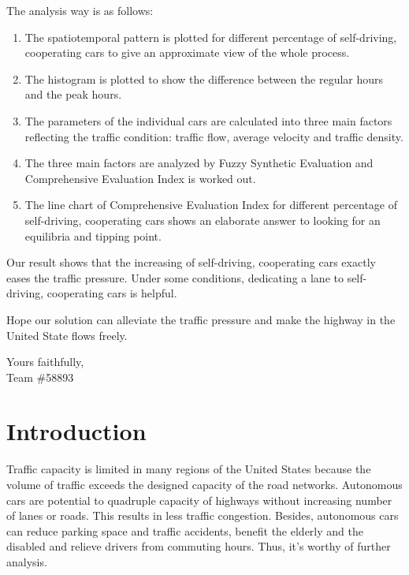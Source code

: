 \documentclass[a4paper]{article}
\begin{document}
\begin{spacing}{1.4}
		The analysis way is as follows:
		\begin{enumerate}
			\item The spatiotemporal pattern is plotted for different percentage of self-driving, cooperating cars to give an approximate view of the whole process.
			\item  The histogram is plotted to show the difference between the regular hours and the peak hours.
			\item  The parameters of the individual cars are calculated into three main factors reflecting the traffic condition: traffic flow, average velocity and traffic density.
			\item  The three main factors are analyzed by Fuzzy Synthetic Evaluation and Comprehensive Evaluation Index is worked out.
			\item  The line chart of Comprehensive Evaluation Index for different percentage of self-driving, cooperating cars shows an elaborate answer to looking for an equilibria and tipping point.
		\end{enumerate}

		Our result shows that the increasing of self-driving, cooperating cars exactly eases the traffic pressure. Under some conditions, dedicating a lane to self-driving, cooperating cars is helpful.

		Hope our solution can alleviate the traffic pressure and make the highway in the United State flows freely.

		\begin{flushleft}
			Yours faithfully,\\
			Team \#58893
		\end{flushleft}

	\end{spacing}


	\newpage
	\tableofcontents
	\newpage

	\section{Introduction}
	Traffic capacity is limited in many regions of the United States because the volume of traffic exceeds the designed capacity of the road networks. Autonomous cars are potential to quadruple capacity of highways without increasing number of lanes or roads. This results in less traffic congestion. Besides, autonomous cars can reduce parking space and traffic accidents, benefit the elderly and the disabled and relieve drivers from commuting hours. Thus, it’s worthy of further analysis.
\end{document}

